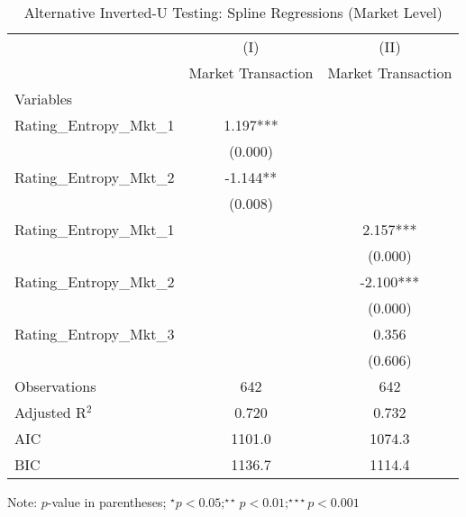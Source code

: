 \begin{table}[]
\centering
 \begin{threeparttable}[t]
\begin{tabular}{@{}lcc@{}}
\toprule
                        & (I)            & (II)           \\ 
                        & Market Transaction       & Market Transaction       \\
Variables               &   &   \\ \midrule
Rating\_Entropy\_Mkt\_1 & 1.197***       &                \\
                        & (0.000)        &                \\
Rating\_Entropy\_Mkt\_2 & -1.144**       &                \\
                        & (0.008)        &                \\
Rating\_Entropy\_Mkt\_1 &                & 2.157***       \\
                        &                & (0.000)        \\
Rating\_Entropy\_Mkt\_2 &                & -2.100***      \\
                        &                & (0.000)        \\
Rating\_Entropy\_Mkt\_3 &                & 0.356          \\
                        &                & (0.606)        \\
Observations            & 642            & 642            \\
Adjusted R$^2$             & 0.720          & 0.732          \\
AIC                     & 1101.0         & 1074.3         \\
BIC                     & 1136.7         & 1114.4         \\ \bottomrule
\end{tabular}%
\begin{tablenotes}
\item Note: $p$-value in parentheses; $^\star p<0.05;^{\star\star} p<0.01;^{\star\star\star} p<0.001 $
\end{tablenotes}
\end{threeparttable}
\caption{Alternative Inverted-U Testing: Spline Regressions (Market Level)}
\label{rob_spline_mkt}
\end{table}